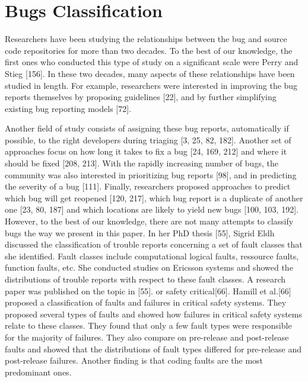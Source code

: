 \documentclass[12pt]{report}
\begin{document}
\section{Bugs Classification}\label{bugs-classification}

Researchers have been studying the relationships between the bug and
source code repositories for more than two decades. To the best of our
knowledge, the first ones who conducted this type of study on a
significant scale were Perry and Stieg {[}156{]}. In these two decades,
many aspects of these relationships have been studied in length. For
example, researchers were interested in improving the bug reports
themselves by proposing guidelines {[}22{]}, and by further simplifying
existing bug reporting models {[}72{]}.

Another field of study consists of assigning these bug reports,
automatically if possible, to the right developers during triaging {[}3,
25, 82, 182{]}. Another set of approaches focus on how long it takes to
fix a bug {[}24, 169, 212{]} and where it should be fixed {[}208,
213{]}. With the rapidly increasing number of bugs, the community was
also interested in prioritizing bug reports {[}98{]}, and in predicting
the severity of a bug {[}111{]}. Finally, researchers proposed
approaches to predict which bug will get reopened {[}120, 217{]}, which
bug report is a duplicate of another one {[}23, 80, 187{]} and which
locations are likely to yield new bugs {[}100, 103, 192{]}. However, to
the best of our knowledge, there are not many attempts to classify bugs
the way we present in this paper. In her PhD thesis {[}55{]}, Sigrid
Eldh discussed the classification of trouble reports concerning a set of
fault classes that she identified. Fault classes include computational
logical faults, ressource faults, function faults, etc. She conducted
studies on Ericsson systems and showed the distributions of trouble
reports with respect to these fault classes. A research paper was
published on the topic in {[}55{]}. or safety critical{[}66{]}. Hamill
et al.{[}66{]} proposed a classification of faults and failures in
critical safety systems. They proposed several types of faults and
showed how failures in critical safety systems relate to these classes.
They found that only a few fault types were responsible for the majority
of failures. They also compare on pre-release and post-release faults
and showed that the distributions of fault types differed for
pre-release and post-release failures. Another finding is that coding
faults are the most predominant ones.
\end{document}
